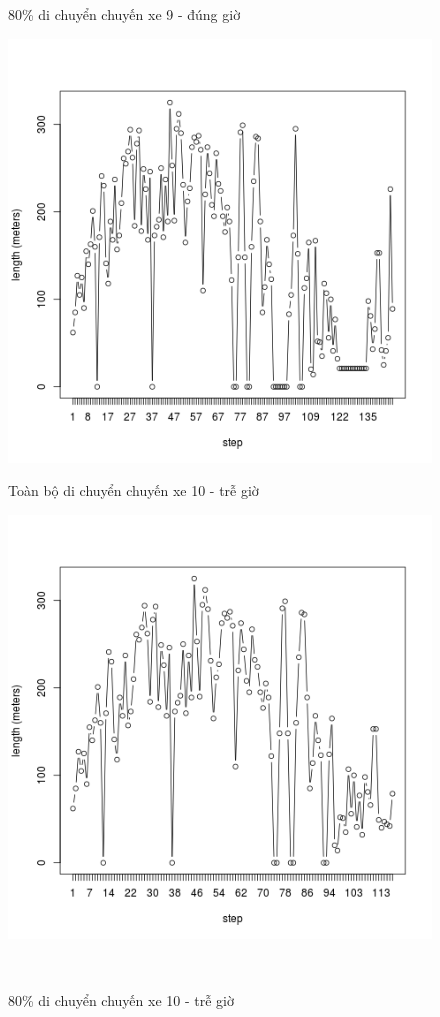 \documentclass[a4paper, 13pt]{report}
\begin{document}
\begin{figure}[!htb]
  \caption*{80\% di chuyển chuyến xe 9 - đúng giờ}
\endminipage
{}%
  \includegraphics[width=\linewidth]{test_100_10}
  \caption*{Toàn bộ di chuyển chuyến xe 10 - trễ giờ}
\endminipage
{}
  \includegraphics[width=\linewidth]{test_80_10}
  \caption*{80\% di chuyển chuyến xe 10 - trễ giờ}
\endminipage\\
\end{figure}
\end{document}

